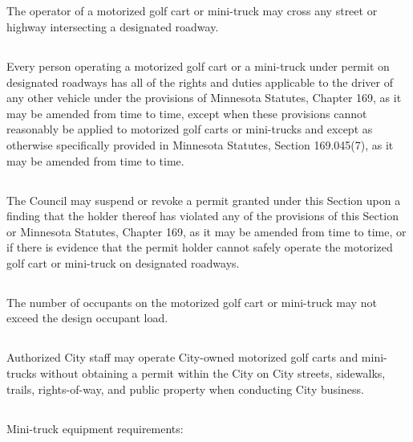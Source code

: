 \subsection{}
The operator of a motorized golf cart or mini-truck may cross any street or highway intersecting a designated roadway.
\subsection{}
Every person operating a motorized golf cart or a mini-truck under permit on designated roadways has all of the rights and duties applicable to the driver of any other vehicle under the provisions of Minnesota Statutes, Chapter 169, as it may be amended from time to time, except when these provisions cannot reasonably be applied to motorized golf carts or mini-trucks and except as otherwise specifically provided in Minnesota Statutes, Section 169.045(7), as it may be amended from time to time.
\subsection{}
The Council may suspend or revoke a permit granted under this Section upon a finding that the holder thereof has violated any of the provisions of this Section or Minnesota Statutes, Chapter 169, as it may be amended from time to time, or if there is evidence that the permit holder cannot safely operate the motorized golf cart or mini-truck on designated roadways.
\subsection{}
The number of occupants on the motorized golf cart or mini-truck may not exceed the design occupant load.
\subsection{}
Authorized City staff may operate City-owned motorized golf carts and mini-trucks without obtaining a permit within the City on City streets, sidewalks, trails, rights-of-way, and public property when conducting City business.
\subsection{}
Mini-truck equipment requirements:
